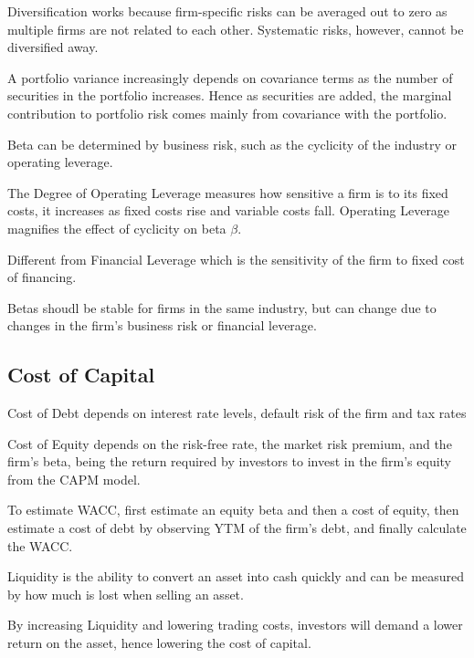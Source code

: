 Diversification works because firm-specific risks can be averaged out to zero as multiple firms are not related to each other. Systematic risks, however, cannot be diversified away.

A portfolio variance increasingly depends on covariance terms as the number of securities in the portfolio increases. Hence as securities are added, the marginal contribution to portfolio risk comes mainly from covariance with the portfolio.

Beta can be determined by business risk, such as the cyclicity of the industry or operating leverage.

The Degree of Operating Leverage measures how sensitive a firm is to its fixed costs, it increases as fixed costs rise and variable costs fall. Operating Leverage magnifies the effect of cyclicity on beta $\beta$.

Different from Financial Leverage which is the sensitivity of the firm to fixed cost of financing.

Betas shoudl be stable for firms in the same industry, but can change due to changes in the firm's business risk or financial leverage.

\subsection{Cost of Capital}
Cost of Debt depends on interest rate levels, default risk of the firm and tax rates

Cost of Equity depends on the risk-free rate, the market risk premium, and the firm's beta, being the return required by investors to invest in the firm's equity from the CAPM model.

To estimate WACC, first estimate an equity beta and then a cost of equity, then estimate a cost of debt by observing YTM of the firm's debt, and finally calculate the WACC.

Liquidity is the ability to convert an asset into cash quickly and can be measured by how much is lost when selling an asset.

By increasing Liquidity and lowering trading costs, investors will demand a lower return on the asset, hence lowering the cost of capital.

